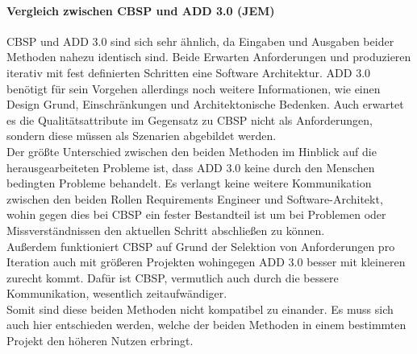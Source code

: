 \paragraph{Vergleich zwischen CBSP und ADD 3.0 (JEM)}
CBSP und ADD 3.0 sind sich sehr \"ahnlich, da Eingaben und Ausgaben beider Methoden nahezu identisch sind. Beide Erwarten Anforderungen und produzieren iterativ mit fest definierten Schritten eine Software Architektur. ADD 3.0 ben\"otigt f\"ur sein Vorgehen allerdings noch weitere Informationen, wie einen Design Grund, Einschr\"ankungen und Architektonische Bedenken. Auch erwartet es die Qualit\"atsattribute im Gegensatz zu CBSP nicht als Anforderungen, sondern diese m\"ussen als Szenarien abgebildet werden. \\
Der gr\"o\ss{}te Unterschied zwischen den beiden Methoden im Hinblick auf die herausgearbeiteten Probleme ist, dass ADD 3.0 keine durch den Menschen bedingten Probleme behandelt. Es verlangt keine weitere Kommunikation zwischen den beiden Rollen Requirements Engineer und Software-Architekt, wohin gegen dies bei CBSP ein fester Bestandteil ist um bei Problemen oder Missverst\"andnissen den aktuellen Schritt abschlie\ss{}en zu k\"onnen. \\
Au\ss{}erdem funktioniert CBSP auf Grund der Selektion von Anforderungen pro Iteration auch mit gr\"o\ss{}eren Projekten wohingegen ADD 3.0 besser mit kleineren zurecht kommt. Daf\"ur ist CBSP, vermutlich auch durch die bessere Kommunikation, wesentlich zeitaufw\"andiger. \\
Somit sind diese beiden Methoden nicht kompatibel zu einander. Es muss sich auch hier entschieden werden, welche der beiden Methoden in einem bestimmten Projekt den h\"oheren Nutzen erbringt. \\
